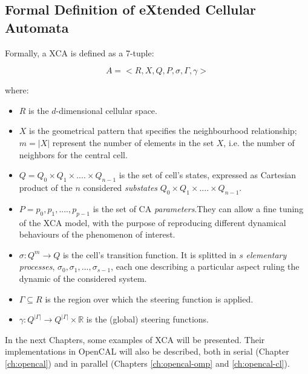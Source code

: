 \subsection{Formal Definition of eXtended Cellular Automata}


Formally, a XCA is defined as a 7-tuple:

$$ A = <R,X,Q,P,\sigma,\Gamma,\gamma>$$

\noindent where:

\begin{itemize}

\item $R$ is the $d$-dimensional cellular space.

\item $X$ is the geometrical pattern that specifies the neighbourhood
  relationship; $m = |X|$ represent the number of elements in the set
  $X$, i.e. the number of neighbors for the central cell.

\item $Q = Q_0 \times Q_1 \times....\times Q_{n-1}$ is the set of
  cell's states, expressed as Cartesian product of the $n$ considered
  \emph{substates} $Q_0 \times Q_1 \times....\times Q_{n-1}$.

\item $P = {p_0,p_1,....,p_{p-1}}$ is the set of CA
  \emph{parameters}.They can allow a fine tuning of the XCA model,
  with the purpose of reproducing different dynamical behaviours of
  the phenomenon of interest.

\item $\sigma : Q^m \rightarrow Q$ is the cell's transition function.
 It is splitted in $s$ \emph{elementary processes}, $\sigma_0,\sigma_1, ...,
  \sigma_{s-1}$, each one describing a particular aspect ruling the
  dynamic of the considered system.

\item $\Gamma \subseteq R$ is the region  over which the steering
  function is applied.

\item $\gamma: Q^{|\Gamma|} \rightarrow Q^{|\Gamma|} \times
  \mathbb{R}$ is the (global) steering functions.

\end{itemize}

In the next Chapters, some examples of XCA will be presented. Their
implementations in OpenCAL will also be described, both in serial
(Chapter \ref{ch:opencal}) and in parallel (Chapters
\ref{ch:opencal-omp} and \ref{ch:opencal-cl}).

